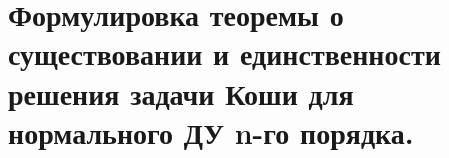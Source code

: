 {
	\section{Формулировка теоремы о существовании и единственности решения задачи Коши для нормального ДУ n-го
	порядка.}

	\newpage
}